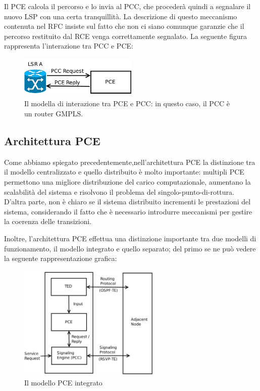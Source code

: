 \documentclass[10pt,a4paper]{report}
\begin{document}
Il PCE calcola il percorso e lo invia al PCC, che procederà quindi a
segnalare il nuovo LSP con una certa tranquillità. La descrizione di
questo meccanismo contenuta nel RFC insiste sul fatto che non ci siano
comunque garanzie che il percorso restituito dal RCE venga
correttamente segnalato. La seguente figura rappresenta l'interazione
tra PCC e PCE:

\begin{figure}[!htbp]
  \centering
  \includegraphics[width=0.5\textwidth]{img/pce_pcc}
  \caption[]{Il modella di interazione tra PCE e PCC: in questo caso,
    il PCC è un router GMPLS.}
\end{figure}

\subsection*{Architettura PCE}

Come abbiamo spiegato precedentemente,nell'architettura PCE la
distinzione tra il modello centralizzato e quello distribuito è molto
importante: multipli PCE permettono una migliore distribuzione del
carico computazionale, aumentano la scalabilità del sistema e
risolvono il problema del singolo-punto-di-rottura. D'altra parte, non
è chiaro se il sistema distribuito incrementi le prestazioni del
sistema, considerando il fatto che è necessario introdurre meccanismi
per gestire la coerenza delle transizioni.

Inoltre, l'architettura PCE effettua una distinzione importante tra
due modelli di funzionamento, il modello integrato e quello separato;
del primo se ne può vedere la seguente rappresentazione grafica:\\

\begin{figure}[!htbp]
  \centering
  \includegraphics[width=0.6\textwidth]{img/pce_composite}
  \caption[]{Il modello PCE integrato}
\end{figure}
\end{document}
